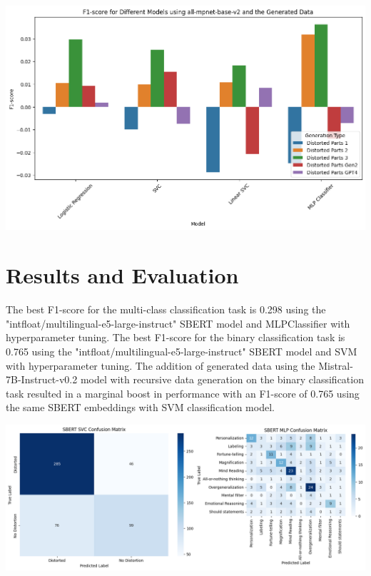 \documentclass[a0,landscape]{a0poster}
\begin{document}
\begin{multicols}{4}
\begin{center}
\includegraphics[width=0.99\linewidth]{figures/generatedDataDiffDiff.png}
\end{center}\vspace{1cm}


\color{Teal}
\section*{Results and Evaluation}
\color{Black}

The best F1-score for the multi-class classification task is 0.298 using the "intfloat/multilingual-e5-large-instruct" SBERT model and MLPClassifier with hyperparameter tuning. The best F1-score for the binary classification task is 0.765 using the "intfloat/multilingual-e5-large-instruct" SBERT model and SVM with hyperparameter tuning. The addition of generated data using the Mistral-7B-Instruct-v0.2 model with recursive data generation on the binary classification task resulted in a marginal boost in performance with an F1-score of 0.765 using the same SBERT embeddings with SVM classification model.

\begin{center}
\includegraphics[width=0.99\linewidth]{figures/finalGraphs.png}
\end{center}\vspace{1cm}


\end{multicols}
\end{document}
